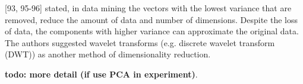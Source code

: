 \textcite{han2011data}[93, 95-96] stated, in data mining the vectors with the lowest variance that are removed, reduce the amount of data and number of dimensions. Despite the loss of data, the components with higher variance can approximate the original data. The authors suggested wavelet transforms (e.g. discrete wavelet transform (DWT)) as another method of dimensionality reduction.


\textbf{todo: more detail (if use PCA in experiment)}.







